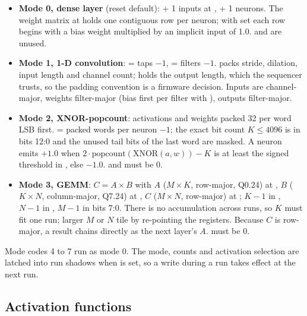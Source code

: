 \begin{itemize}
	\item \textbf{Mode 0, dense layer} (reset default):  + 1 inputs at ,  + 1 neurons. The weight matrix at  holds one contiguous row per neuron; with  set each row begins with a bias weight multiplied by an implicit input of 1.0.  and  are unused.
	\item \textbf{Mode 1, 1-D convolution}:  = taps $- 1$,  = filters $- 1$.  packs stride, dilation, input length and channel count;  holds the output length, which the sequencer trusts, so the padding convention is a firmware decision. Inputs are channel-major, weights filter-major (bias first per filter with ), outputs filter-major.
	\item \textbf{Mode 2, XNOR-popcount}: activations and weights packed 32 per word LSB first.  = packed words per neuron $- 1$; the exact bit count $K \le 4096$ is in  bits 12:0 and the unused tail bits of the last word are masked. A neuron emits $+1.0$ when $2 \cdot \mathrm{popcount}(\mathrm{XNOR}(a, w)) - K$ is at least the signed threshold in , else $-1.0$.  and  must be 0.
	\item \textbf{Mode 3, GEMM}: $C = A \times B$ with $A$ ($M \times K$, row-major, Q0.24) at , $B$ ($K \times N$, column-major, Q7.24) at , $C$ ($M \times N$, row-major) at ; $K - 1$ in , $N - 1$ in , $M - 1$ in  bits 7:0. There is no accumulation across runs, so $K$ must fit one run; larger $M$ or $N$ tile by re-pointing the registers. Because $C$ is row-major, a result chains directly as the next layer's $A$.  must be 0.
\end{itemize}

Mode codes 4 to 7 run as mode 0. The mode, counts and activation selection are latched into run shadows when  is set, so a write during a run takes effect at the next run.

\subsection{Activation functions}

